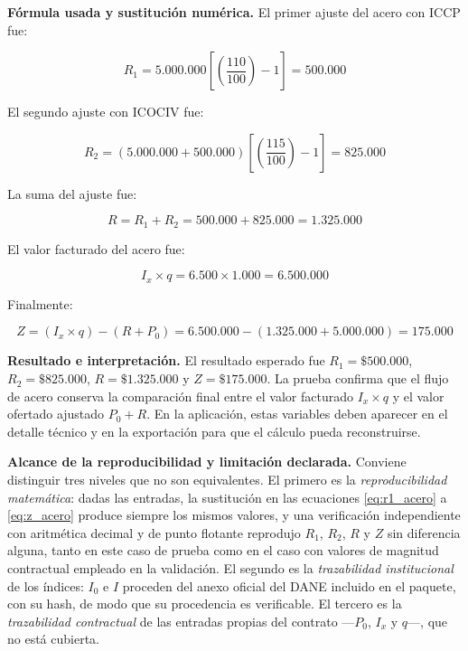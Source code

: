 \documentclass[12pt,letterpaper]{article}
\newcommand{\ICOCIV}{ICOCIV}
\newcommand{\ICCP}{ICCP}
\newcommand{\DANE}{DANE}
\begin{document}
\textbf{Fórmula usada y sustitución numérica.} El primer ajuste del acero con \ICCP{} fue:

\begin{equation}
R_1=5.000.000\left[\left(\frac{110}{100}\right)-1\right]=500.000
\end{equation}

El segundo ajuste con \ICOCIV{} fue:

\begin{equation}
R_2=(5.000.000+500.000)\left[\left(\frac{115}{100}\right)-1\right]=825.000
\end{equation}

La suma del ajuste fue:

\begin{equation}
R=R_1+R_2=500.000+825.000=1.325.000
\end{equation}

El valor facturado del acero fue:

\begin{equation}
I_x \times q=6.500 \times 1.000=6.500.000
\end{equation}

Finalmente:

\begin{equation}
Z=(I_x \times q)-(R+P_0)=6.500.000-(1.325.000+5.000.000)=175.000
\end{equation}

\textbf{Resultado e interpretación.} El resultado esperado fue \(R_1=\$500.000\), \(R_2=\$825.000\), \(R=\$1.325.000\) y \(Z=\$175.000\). La prueba confirma que el flujo de acero conserva la comparación final entre el valor facturado \(I_x \times q\) y el valor ofertado ajustado \(P_0+R\). En la aplicación, estas variables deben aparecer en el detalle técnico y en la exportación para que el cálculo pueda reconstruirse.

\textbf{Alcance de la reproducibilidad y limitación declarada.} Conviene distinguir tres niveles que no son equivalentes. El primero es la \emph{reproducibilidad matemática}: dadas las entradas, la sustitución en las ecuaciones \ref{eq:r1_acero} a \ref{eq:z_acero} produce siempre los mismos valores, y una verificación independiente con aritmética decimal y de punto flotante reprodujo \(R_1\), \(R_2\), \(R\) y \(Z\) sin diferencia alguna, tanto en este caso de prueba como en el caso con valores de magnitud contractual empleado en la validación. El segundo es la \emph{trazabilidad institucional} de los índices: \(I_0\) e \(I\) proceden del anexo oficial del \DANE{} incluido en el paquete, con su hash, de modo que su procedencia es verificable. El tercero es la \emph{trazabilidad contractual} de las entradas propias del contrato ---\(P_0\), \(I_x\) y \(q\)---, que no está cubierta.
\end{document}
